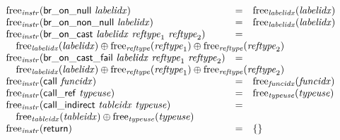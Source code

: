 $$\begin{array}[t]{@{}lcl@{}l@{}}
{\begin{array}[t]{@{}l@{}}
\end{array}
} \\
{\mathrm{free}}_{\mathit{instr}}(\mathsf{br\_on\_null}~{\mathit{labelidx}}) & = & {\mathrm{free}}_{\mathit{labelidx}}({\mathit{labelidx}}) \\
{\mathrm{free}}_{\mathit{instr}}(\mathsf{br\_on\_non\_null}~{\mathit{labelidx}}) & = & {\mathrm{free}}_{\mathit{labelidx}}({\mathit{labelidx}}) \\
{\mathrm{free}}_{\mathit{instr}}(\mathsf{br\_on\_cast}~{\mathit{labelidx}}~{\mathit{reftype}}_1~{\mathit{reftype}}_2) & = & & \\
 \multicolumn{4}{@{}l@{}}{\quad
\begin{array}[t]{@{}l@{}}
{\mathrm{free}}_{\mathit{labelidx}}({\mathit{labelidx}}) \oplus {\mathrm{free}}_{\mathit{reftype}}({\mathit{reftype}}_1) \oplus {\mathrm{free}}_{\mathit{reftype}}({\mathit{reftype}}_2) \\
\end{array}
} \\
{\mathrm{free}}_{\mathit{instr}}(\mathsf{br\_on\_cast\_fail}~{\mathit{labelidx}}~{\mathit{reftype}}_1~{\mathit{reftype}}_2) & = & & \\
 \multicolumn{4}{@{}l@{}}{\quad
\begin{array}[t]{@{}l@{}}
{\mathrm{free}}_{\mathit{labelidx}}({\mathit{labelidx}}) \oplus {\mathrm{free}}_{\mathit{reftype}}({\mathit{reftype}}_1) \oplus {\mathrm{free}}_{\mathit{reftype}}({\mathit{reftype}}_2) \\
\end{array}
} \\
{\mathrm{free}}_{\mathit{instr}}(\mathsf{call}~{\mathit{funcidx}}) & = & {\mathrm{free}}_{\mathit{funcidx}}({\mathit{funcidx}}) \\
{\mathrm{free}}_{\mathit{instr}}(\mathsf{call\_ref}~{\mathit{typeuse}}) & = & {\mathrm{free}}_{\mathit{typeuse}}({\mathit{typeuse}}) \\
{\mathrm{free}}_{\mathit{instr}}(\mathsf{call\_indirect}~{\mathit{tableidx}}~{\mathit{typeuse}}) & = & & \\
 \multicolumn{4}{@{}l@{}}{\quad
\begin{array}[t]{@{}l@{}}
{\mathrm{free}}_{\mathit{tableidx}}({\mathit{tableidx}}) \oplus {\mathrm{free}}_{\mathit{typeuse}}({\mathit{typeuse}}) \\
\end{array}
} \\
{\mathrm{free}}_{\mathit{instr}}(\mathsf{return}) & = & \{  \} \\

\end{array}$$
